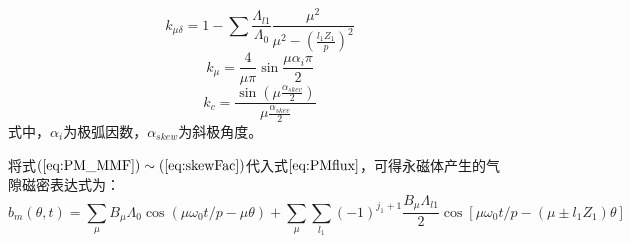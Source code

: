 \documentclass[11pt,a4paper]{article}
\begin{document}
\begin{equation}k_{\mu \delta}=1-\sum \frac{\Lambda_{l 1}}{\Lambda_{0}} \frac{\mu^{2}}{\mu^{2}-\left(\frac{l_{1} Z_{1}}{p}\right)^{2}}\end{equation}
\begin{equation}k_{\mu}=\frac{4}{\mu \pi} \sin \frac{\mu \alpha_{i} \pi}{2}\end{equation}
\begin{equation} \label{eq:skewFac} k_{c}=\frac{\sin \left(\mu \frac{\alpha_{s k e v}}{2}\right)}{\mu \frac{\alpha_{s k e v}}{2}}\end{equation}
式中，$ \alpha_{i} $为极弧因数，$ \alpha_{skew} $为斜极角度。\par
将式$ \left( \ref{eq:PM_MMF}\right) \sim \left( \ref{eq:skewFac}\right)  $代入式$ \ref{eq:PMflux} $，可得永磁体产生的气隙磁密表达式为：
\begin{equation}b_{m}(\theta, t)=\sum_{\mu} B_{\mu} \Lambda_{0} \cos \left(\mu \omega_{0} t / p-\mu \theta\right)+\sum_{\mu} \sum_{l_{1}}(-1)^{j_{1}+1} \frac{B_{\mu} \Lambda_{l 1}}{2} \cos \left[\mu \omega_{0} t / p-\left(\mu \pm l_{1} Z_{1}\right) \theta\right]\end{equation}
\end{document}
